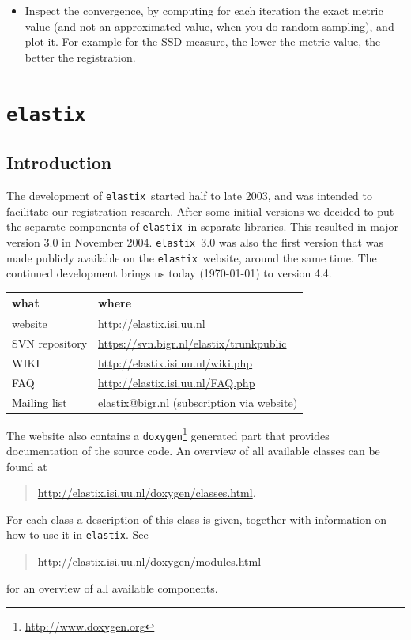 \documentclass[]{report}
\newcommand{\elastix}{\texttt{elastix}}
\begin{document}
\begin{itemize}
\item Inspect the convergence, by computing for each iteration
the exact metric value (and not an approximated value, when you do
random sampling), and plot it. For example for the SSD measure,
the lower the metric value, the better the registration.

\end{itemize}




\chapter{\elastix}\label{chp:elastix}

\section{Introduction}\label{sec:elastix:intro}

The development of \elastix\ started half to late 2003, and was intended to
facilitate our registration research. After some initial versions we decided to
put the separate components of \elastix\ in separate libraries. This resulted
in major version 3.0 in November 2004. \elastix\ 3.0 was also the first version
that was made publicly available on the \elastix\ website, around the same
time. The continued development brings us today (\today) to version 4.4.

\begin{table}[h!]
\begin{tabular}{l|l}
what & where \\
\hline
website        & \url{http://elastix.isi.uu.nl} \\
SVN repository & \url{https://svn.bigr.nl/elastix/trunkpublic} \\
WIKI           & \url{http://elastix.isi.uu.nl/wiki.php} \\
FAQ            & \url{http://elastix.isi.uu.nl/FAQ.php} \\
Mailing list   & \url{elastix@bigr.nl} (subscription via website) \\
\end{tabular}
\end{table}

The website also contains a
\texttt{doxygen}\footnote{\url{http://www.doxygen.org}} generated part that
provides documentation of the source code. An overview of all available classes
can be found at
\begin{quote}
\url{http://elastix.isi.uu.nl/doxygen/classes.html}.
\end{quote}
For each class a description of this class is given, together with
information on how to use it in \elastix. See
\begin{quote}
\url{http://elastix.isi.uu.nl/doxygen/modules.html}
\end{quote}
for an overview of all available components.
\end{document}
